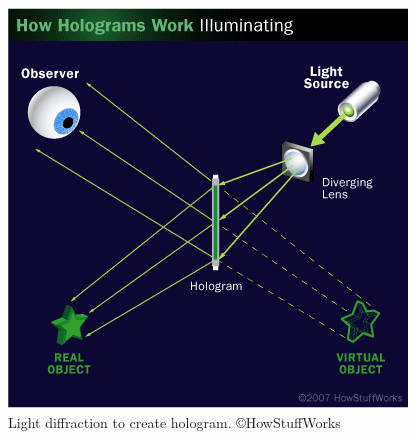 \begin{figure}[!ht]
\centering
\includegraphics[width=0.9\linewidth,keepaspectratio=true]{figs/hologram-15.png}
\caption{Light diffraction to create hologram. ©HowStuffWorks}
\label{fig:hologram}
\end{figure}